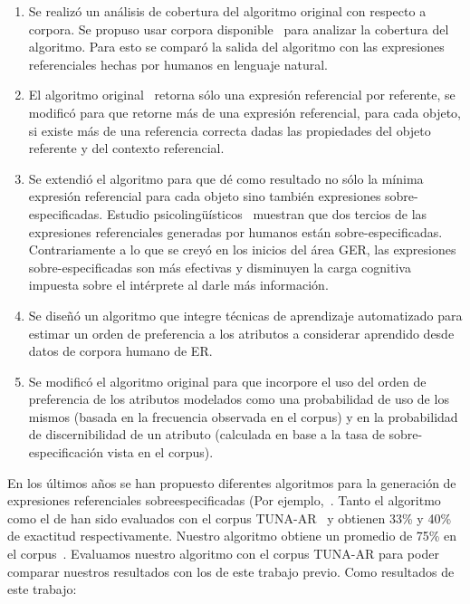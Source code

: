 \begin{enumerate} \renewcommand{\itemsep}{-3pt}
   \item Se realiz\'o un an\'alisis de cobertura del algoritmo original con respecto a corpora. Se propuso usar corpora disponible~\cite{viethen-dale:2011:UCNLG+Eval} para analizar la cobertura del algoritmo. Para esto se compar\'o la salida del algoritmo con las expresiones referenciales hechas por humanos en lenguaje natural. 
   \item El algoritmo original~\cite{Areces2008} retorna s\'olo una expresi\'on referencial por referente, se modific\'o para que retorne m\'as de una expresi\'on referencial, para cada objeto, si existe m\'as de una referencia correcta dadas las propiedades del objeto referente y del contexto referencial.
   \item Se extendi\'o el algoritmo para que d\'e como resultado no s\'olo la m\'inima expresi\'on referencial para cada objeto sino tambi\'en expresiones sobre-especificadas. Estudio psicoling\"u\'isticos~\cite{keysar:Curr98} muestran que dos tercios de las expresiones referenciales generadas por humanos est\'an sobre-especificadas. Contrariamente a lo que se crey\'o en los inicios del \'area GER, las expresiones sobre-especificadas son m\'as efectivas y disminuyen la carga cognitiva impuesta sobre el int\'erprete al darle m\'as informaci\'on. 
   \item Se dise\~n\'o un algoritmo que integre t\'ecnicas de aprendizaje automatizado para estimar un orden de preferencia a los atributos a considerar aprendido desde datos de corpora humano de ER.
   \item Se modific\'o el algoritmo original para que incorpore el uso del orden de preferencia de los atributos modelados como una probabilidad de uso de los mismos (basada en la frecuencia observada en el corpus) y en la probabilidad de discernibilidad de un atributo (calculada en base a la tasa de sobre-especificaci\'on vista en el corpus).
\end{enumerate}

En los \'ultimos a\~nos se han propuesto diferentes algoritmos para la generaci\'on de expresiones referenciales sobreespecificadas (Por ejemplo,~\cite{ruudINLG2012}. Tanto el algoritmo~\cite{delucenaENLG} como el de \cite{ruudINLG2012} han sido evaluados con el corpus TUNA-AR~\cite{gattENLG} y obtienen 33\% y 40\% de exactitud respectivamente. Nuestro algoritmo obtiene un promedio de 75\% en el corpus~\cite{viethen-dale:2011:UCNLG+Eval}. Evaluamos nuestro algoritmo con el corpus TUNA-AR para poder comparar nuestros resultados con los de este trabajo previo. Como resultados de este trabajo:

